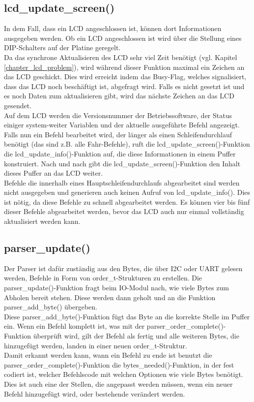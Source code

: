 \subsection{lcd\_update\_screen()}
In dem Fall, dass ein LCD angeschlossen ist, können dort Informationen ausgegeben werden. Ob ein LCD
angeschlossen ist wird über die Stellung eines DIP-Schalters auf der Platine geregelt.\\
Da das synchrone Aktualisieren des LCD sehr viel Zeit benötigt (vgl. Kapitel \ref{chapter_lcd_problem}), wird
während dieser Funktion maximal ein Zeichen an das LCD geschickt. Dies wird erreicht indem das Busy-Flag,
welches signalisiert, dass das LCD noch beschäftigt ist, abgefragt wird. Falls es nicht gesetzt ist und
es noch Daten zum aktualisieren gibt, wird das nächste Zeichen an das LCD gesendet.\\
Auf dem LCD werden die Versionsnummer der Betriebssoftware, der Status einiger system-weiter Variablen und
der aktuelle ausgeführte Befehl angezeigt. Falls nun ein Befehl bearbeitet wird, der länger als einen
Schleifendurchlauf benötigt (das sind z.B. alle Fahr-Befehle), ruft die lcd\_\-update\_\-screen()-Funktion
die lcd\_\-update\_\-info()-Funktion auf, die diese Informationen in einem Puffer konstruiert. Nach und nach
gibt die lcd\_\-update\_\-screen()-Funktion den Inhalt dieses Puffer an das LCD weiter.\\
Befehle die innerhalb eines Hauptschleifendurchlaufs abgearbeitet sind werden nicht ausgegeben und
generieren auch keinen Aufruf von lcd\_\-update\_\-info(). Dies ist nötig, da diese Befehle zu schnell abgearbeitet
werden. Es können vier bis fünf dieser Befehle abgearbeitet werden, bevor das LCD auch nur einmal vollständig
aktualisiert werden kann.

\subsection{parser\_update()}
Der Parser ist dafür zuständig aus den Bytes, die über I2C oder UART gelesen werden, Befehle in Form von
order\_t-Strukturen zu erstellen. Die parser\_\-update()-Funktion fragt beim IO-Modul nach, wie viele Bytes
zum Abholen bereit stehen. Diese werden dann geholt und an die Funktion parser\_\-add\_\-byte() übergeben.\\
Diese parser\_\-add\_\-byte()-Funktion fügt das Byte an die korrekte Stelle im Puffer ein. Wenn ein Befehl
komplett ist, was mit der parser\_\-order\_\-complete()-Funktion überprüft wird, gilt der Befehl als fertig und
alle weiteren Bytes, die hinzugefügt werden, landen in einer neuen order\_t-Struktur.\\
Damit erkannt werden kann, wann ein Befehl zu ende ist benutzt die parser\_\-order\_\-complete()-Funktion
die bytes\_\-needed()-Funktion, in der fest codiert ist, welcher Befehlscode mit welchen Optionen wie viele
Bytes benötigt. Dies ist auch eine der Stellen, die angepasst werden müssen, wenn ein neuer Befehl hinzugefügt
wird, oder bestehende verändert werden.

